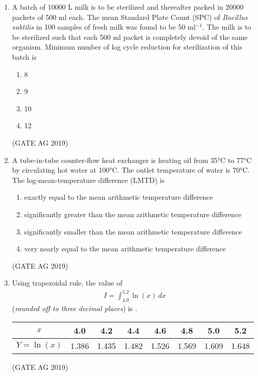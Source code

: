 \documentclass[journal,12pt,onecolumn]{IEEEtran}
\theoremstyle{remark}
\begin{document}
\begin{enumerate}
\item  A batch of 10000 L milk is to be sterilized and thereafter packed in 20000 packets of 500 ml each. The mean Standard Plate Count (SPC) of \textit{Bacillus subtilis} in 100 samples of fresh milk was found to be 50 ml$^{-1}$. The milk is to be sterilized such that each 500 ml packet is completely devoid of the same organism. Minimum number of log cycle reduction for sterilization of this batch is
\begin{multicols}{4}
\begin{enumerate}
    \item 8
    \item 9
    \item 10
    \item 12
\end{enumerate}
\end{multicols}
\hfill{(GATE AG 2019)}


\item  A tube-in-tube counter-flow heat exchanger is heating oil from 35°C to 77°C by circulating hot water at 100°C. The outlet temperature of water is 70°C. The log-mean-temperature difference (LMTD) is  

\begin{enumerate}
    \item exactly equal to the mean arithmetic temperature difference
    \item significantly greater than the mean arithmetic temperature difference
    \item significantly smaller than the mean arithmetic temperature difference
    \item very nearly equal to the mean arithmetic temperature difference
\end{enumerate}
\hfill{(GATE AG 2019)}



\item  Using trapezoidal rule, the value of 
\begin{align*}
I = \int_{4.0}^{5.2} \ln(x) \, dx
\end{align*}
(\textit{rounded off to three decimal places}) is \underline{\hspace{2cm}}.  

\begin{center}
\begin{tabular}{|c|c|c|c|c|c|c|c|}
$x$ & 4.0 & 4.2 & 4.4 & 4.6 & 4.8 & 5.0 & 5.2 \\
\hline
$Y = \ln(x)$ & 1.386 & 1.435 & 1.482 & 1.526 & 1.569 & 1.609 & 1.648
\end{tabular}
\end{center}
\hfill{(GATE AG 2019)}




\end{enumerate}
\end{document}
